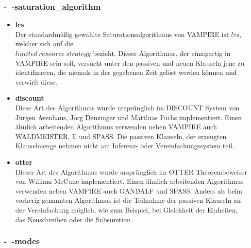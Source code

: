 \documentclass{acm_proc_article-sp-german}
\begin{document}
\subsubsection{-~-saturation\_algorithm}
\label{subsubsec: commandssaturationalgorithm}
\begin{itemize}
	\item \textbf{lrs}\\
			Der standardmäßig gewählte Saturationsalgorithmus von VAMPIRE ist $lrs$, welcher sich auf die \\$ limited~resource~strategy $ bezieht.
			Dieser Algorithmus, der einzigartig in VAMPIRE sein soll, versucht unter den passiven und neuen Klauseln jene zu identifizieren, die niemals in der gegebenen Zeit gelöst werden können und verwirft diese. \cite{riazanov2003limited} \\
	\item \textbf{discount}\\
			Diese Art des Algorithmus wurde ursprünglich im DISCOUNT System von Jürgen Avenhaus, Jörg Denzinger und Matthias Fuchs implementiert.
			Einen ähnlich arbeitenden Algorithmus verwenden neben VAMPIRE auch WALDMEISTER, E und SPASS. 
			Die passiven Klauseln, der erzeugten Klauselmenge nehmen nicht am Inferenz- oder Vereinfachungssystem teil. \cite{riazanov2003limited} \\
	\item \textbf{otter}\\
			Dieser Art des Algorithmus wurde ursprünglich im OTTER Theorembeweiser von William McCune implementiert.
			Einen ähnlich arbeitenden Algorithmus verwenden neben VAMPIRE auch GANDALF und SPASS. 
			Anders als beim vorherig genannten Algorithmus ist die Teilnahme der passiven Klauseln an der Vereinfachung möglich, wie zum Beispiel, bei Gleichheit der Einheiten, das Neuschreiben oder die Subsumtion. \cite{riazanov2003limited} \\
\end{itemize}

\subsubsection{-~-modes}
\label{subsubsec:commandsmodes}
\end{document}
